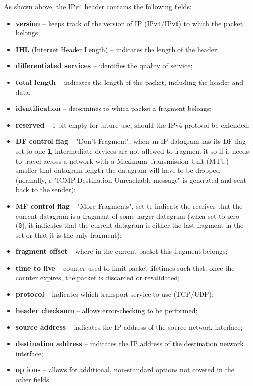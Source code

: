 \documentclass[a4paper]{systems-software}
\begin{document}
As shown above, the IPv4 header contains the following fields:
\begin{itemize}
	\item \textbf{version} -- keeps track of the version of IP (IPv4/IPv6) to which the packet belongs;
	\item \textbf{IHL} (Internet Header Length) -- indicates the length of the header;
	\item \textbf{differentiated services} -- identifies the quality of service;
	\item \textbf{total length} -- indicates the length of the packet, including the header and data;
	\item \textbf{identification} -- determines to which packet a fragment belongs;
	\item \textbf{reserved} -- 1-bit empty for future use, should the IPv4 protocol be extended;
	\item \textbf{DF control flag} -- "Don't Fragment", when an IP datagram has its DF flag set to one \texttt{1}, intermediate devices are not allowed to fragment it so if it needs to travel across a network with a Maximum Transmission Unit (MTU) smaller that datagram length the datagram will have to be dropped (normally, a "ICMP Destination Unreachable message" is generated and sent back to the sender);
	\item \textbf{MF control flag} -- "More Fragments", set to indicate the receiver that the current datagram is a fragment of some larger datagram (when set to zero (\texttt{0}), it indicates that the current datagram is either the last fragment in the set or that it is the only fragment);
	\item \textbf{fragment offset} -- where in the current packet this fragment belongs;
	\item \textbf{time to live} -- counter used to limit packet lifetimes such that, once the counter expires, the packet is discarded or revalidated;
	\item \textbf{protocol} -- indicates which transport service to use (TCP/UDP);
	\item \textbf{header checksum} -- allows error-checking to be performed;
	\item \textbf{source address} -- indicates the IP address of the source network interface;
	\item \textbf{destination address} -- indicates the IP address of the destination network interface;
	\item \textbf{options} -- allows for additional, non-standard options not covered in the other fields.
\end{itemize}
\end{document}
